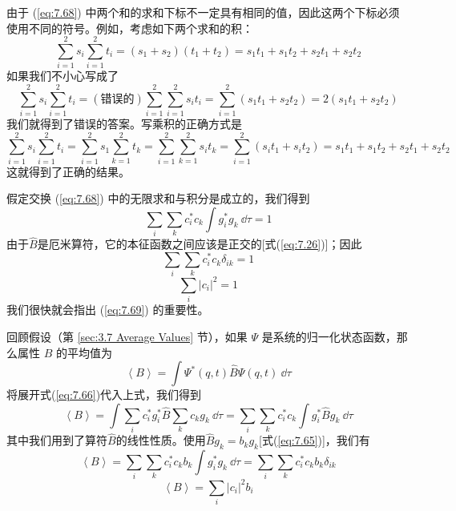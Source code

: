     由于 (\ref{eq:7.68}) 中两个和的求和下标不一定具有相同的值，因此这两个下标必须使用不同的符号。例如，考虑如下两个求和的积：
    \begin{equation*}
        \sum_{i=1}^{2}s_i\sum_{i=1}^{2}t_i = \left(s_1+s_2\right)\left(t_1+t_2\right) = s_1t_1 + s_1t_2 + s_2t_1 + s_2t_2
    \end{equation*}
    如果我们不小心写成了
    \begin{equation*}
        \sum_{i=1}^{2}s_i\sum_{i=1}^{2}t_i = \left(\text{错误的}\right)\sum_{i=1}^{2}\sum_{i=1}^{2}s_i t_i = \sum_{i=1}^{2}\left(s_1t_1+s_2t_2\right) = 2\left(s_1t_1+s_2t_2\right)
    \end{equation*}
    我们就得到了错误的答案。写乘积的正确方式是
    \begin{equation*}
        \sum_{i=1}^{2}s_i\sum_{i=1}^{2}t_i = \sum_{i=1}^{2}s_1\sum_{k=1}^{2}t_k = \sum_{i=1}^{2}\sum_{k=1}^{2}s_i t_k = \sum_{i=1}^{2}\left(s_it_1+s_it_2\right) = s_1t_1 + s_1t_2 + s_2t_1 + s_2t_2
    \end{equation*}
    这就得到了正确的结果。

    假定交换 (\ref{eq:7.68}) 中的无限求和与积分是成立的，我们得到
    \begin{equation*}
        \sum_{i}\sum_{k}c_i^{\ast}c_k\int g_i^{\ast}g_k\:\dd \tau = 1
    \end{equation*}
    由于$\hat{B}$是厄米算符，它的本征函数之间应该是正交的[式(\ref{eq:7.26})]；因此
    \begin{equation*}
        \sum_i\sum_kc_i^{\ast}c_k\delta_{ik} = 1
    \end{equation*}
    \begin{equation}
        \sum_i\left|c_i\right|^2 = 1
        \label{eq:7.69}
    \end{equation}
    我们很快就会指出 (\ref{eq:7.69}) 的重要性。

    回顾假设（第 \ref{sec:3.7 Average Values} 节），如果 $\Psi$ 是系统的归一化状态函数，那么属性 $B$ 的平均值为
    \begin{equation*}
        \left\langle B \right\rangle = \int \Psi^{\ast}\left(q,t\right)\hat{B}\Psi\left(q,t\right)\:\dd \tau
    \end{equation*}
    将展开式(\ref{eq:7.66})代入上式，我们得到
    \begin{equation*}
        \left\langle B \right\rangle = \int\sum_{i}c_i^{\ast}g_i^{\ast}\hat{B}\sum_{k}c_kg_k\:\dd \tau = \sum_{i}\sum_{k}c_i^{\ast}c_k\int g_i^{\ast}\hat{B}g_k\:\dd \tau
    \end{equation*}
    其中我们用到了算符$\hat{B}$的线性性质。使用$\hat{B}g_k = b_kg_k$[式(\ref{eq:7.65})]，我们有
    \begin{equation*}
        \left\langle B \right\rangle = \sum_{i}\sum_{k}c_i^{\ast}c_kb_k\int g_i^{\ast}g_k\:\dd \tau = \sum_{i}\sum_{k}c_i^{\ast}c_kb_k\delta_{ik}
    \end{equation*}
    \begin{equation}
        \left\langle B \right\rangle = \sum_{i}\left|c_i\right|^2b_i
        \label{eq:7.70}
    \end{equation}

